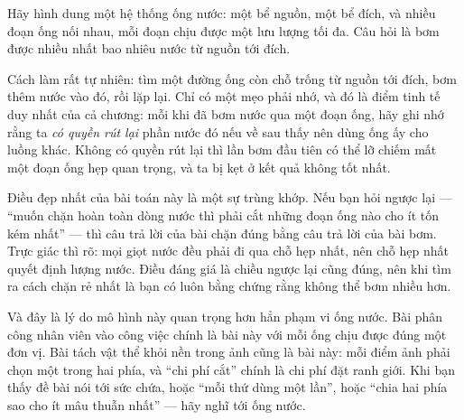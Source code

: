 \documentclass[../../algorithm.tex]{subfiles}
\begin{document}
\begin{dongian}
Hãy hình dung một hệ thống ống nước: một bể nguồn, một bể đích, và nhiều đoạn ống nối nhau, mỗi đoạn chịu được một lưu lượng tối đa. Câu hỏi là bơm được nhiều nhất bao nhiêu nước từ nguồn tới đích.

Cách làm rất tự nhiên: tìm một đường ống còn chỗ trống từ nguồn tới đích, bơm thêm nước vào đó, rồi lặp lại. Chỉ có một mẹo phải nhớ, và đó là điểm tinh tế duy nhất của cả chương: mỗi khi đã bơm nước qua một đoạn ống, hãy ghi nhớ rằng ta \emph{có quyền rút lại} phần nước đó nếu về sau thấy nên dùng ống ấy cho luồng khác. Không có quyền rút lại thì lần bơm đầu tiên có thể lỡ chiếm mất một đoạn ống hẹp quan trọng, và ta bị kẹt ở kết quả không tốt nhất.

Điều đẹp nhất của bài toán này là một sự trùng khớp. Nếu bạn hỏi ngược lại --- ``muốn chặn hoàn toàn dòng nước thì phải cắt những đoạn ống nào cho ít tốn kém nhất'' --- thì câu trả lời của bài chặn đúng bằng câu trả lời của bài bơm. Trực giác thì rõ: mọi giọt nước đều phải đi qua chỗ hẹp nhất, nên chỗ hẹp nhất quyết định lượng nước. Điều đáng giá là chiều ngược lại cũng đúng, nên khi tìm ra cách chặn rẻ nhất là bạn có luôn bằng chứng rằng không thể bơm nhiều hơn.

Và đây là lý do mô hình này quan trọng hơn hẳn phạm vi ống nước. Bài phân công nhân viên vào công việc chính là bài này với mỗi ống chịu được đúng một đơn vị. Bài tách vật thể khỏi nền trong ảnh cũng là bài này: mỗi điểm ảnh phải chọn một trong hai phía, và ``chi phí cắt'' chính là chi phí đặt ranh giới. Khi bạn thấy đề bài nói tới sức chứa, hoặc ``mỗi thứ dùng một lần'', hoặc ``chia hai phía sao cho ít mâu thuẫn nhất'' --- hãy nghĩ tới ống nước.
\end{dongian}
\end{document}
